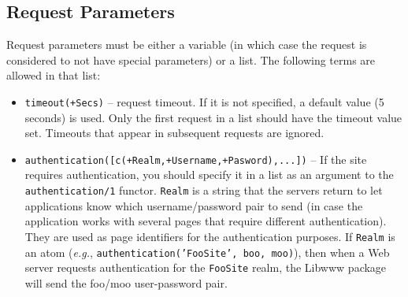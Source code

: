 \subsection{Request Parameters}

Request parameters must be either a variable (in which case the request is
considered to not have special parameters) or a list. The following terms
are allowed in that list:
\begin{itemize}
  \item {\tt timeout(+Secs)} -- request timeout. If it is not specified, a
    default value (5 seconds) is used. Only the first request in a list
    should have the timeout value set. Timeouts that appear in subsequent
    requests are ignored.
  \item {\tt authentication([c(+Realm,+Username,+Pasword),...])} -- If the
    site requires authentication, you should specify it in a list as an
    argument to the {\tt authentication/1} functor. {\tt Realm} is a string
    that the servers return to let applications know which
    username/password pair to send (in case the application works with
    several pages that require different authentication). They are used as
    page identifiers for the authentication purposes. If {\tt Realm} is an
    atom ({\it e.g.}, {\tt authentication('FooSite', boo, moo)}), then when
    a Web server requests authentication for the {\tt FooSite} realm, the
    Libwww package will send the foo/moo user-password pair.


\end{itemize}
